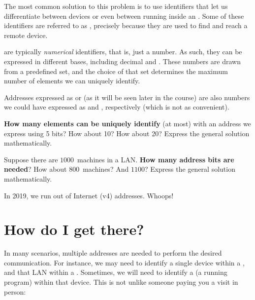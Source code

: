 The most common solution to this problem is to use identifiers that let
us differentiate between devices or even between running 
inside an . Some of these identifiers are
referred to as , precisely because they are used 
to find and reach a remote device. 


 are typically \textit{numerical} identifiers, that is, just a number.
As such, they can be expressed in different bases, including decimal and .
These numbers are drawn from a predefined set, and the choice of that set
determines the maximum number of elements we can uniquely identify.

\begin{remark}
Addresses expressed as  or  
(as it will be seen later in the course) are also numbers we could have expressed 
as  and , respectively
(which is not as convenient).
\end{remark}

\begin{exercise}
\textbf{How many elements can be uniquely identify} (at most) with an address we express 
using 5 bits? How about 10? How about 20? Express the general solution mathematically.
\end{exercise}

\begin{exercise}
Suppose there are $1000$~machines in a LAN. \textbf{How many address bits are needed}?
How about $800$~machines? And $1100$? Express the general solution mathematically.
\end{exercise} 

\begin{remark}
In 2019, we run out of Internet (v4) addresses. Whoops!
\end{remark}

\section{How do I get there?}

In many scenarios, multiple addresses are needed to perform the desired 
 communication. For instance, we may need to identify
a single device within a , and that LAN within a . Sometimes, we will need 
to identify a  (a running program) within that device. 
This is not unlike someone paying you a visit in person:

